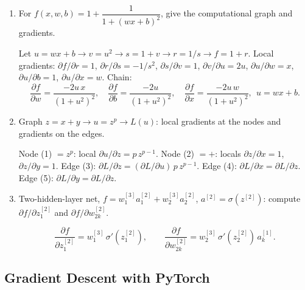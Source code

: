 \documentclass[10pt,a4paper]{article}
\newcommand{\q}[1]{\item #1}
\begin{document}
\begin{enumerate}[leftmargin=*,label=\textbf{Q\arabic*.}]

\q For $f(x,w,b)=1+\dfrac{1}{1+(wx+b)^2}$, give the computational graph and gradients.
\begin{answerbox}
Let $u=wx+b \to v=u^2 \to s=1+v \to r=1/s \to f=1+r$. Local gradients: $\partial f/\partial r=1$, $\partial r/\partial s=-1/s^2$, $\partial s/\partial v=1$, $\partial v/\partial u=2u$, $\partial u/\partial w=x$, $\partial u/\partial b=1$, $\partial u/\partial x=w$. Chain:
\[ \frac{\partial f}{\partial w} = \frac{-2u\,x}{(1+u^2)^2},\quad
   \frac{\partial f}{\partial b} = \frac{-2u}{(1+u^2)^2},\quad
   \frac{\partial f}{\partial x} = \frac{-2u\,w}{(1+u^2)^2},\ \ u=wx+b. \]
\end{answerbox}

\q Graph $z=x+y \to u=z^p \to L(u)$: local gradients at the nodes and gradients on the edges.
\begin{answerbox}
Node (1) $=z^p$: local $\partial u/\partial z = p\,z^{p-1}$. Node (2) $=+$: locals $\partial z/\partial x=1$, $\partial z/\partial y=1$.
Edge (3): $\partial L/\partial z = (\partial L/\partial u)\,p\,z^{p-1}$. Edge (4): $\partial L/\partial x = \partial L/\partial z$. Edge (5): $\partial L/\partial y = \partial L/\partial z$.
\end{answerbox}

\q Two-hidden-layer net, $f=w^{[3]}_1 a^{[2]}_1 + w^{[3]}_2 a^{[2]}_2$, $a^{[2]}=\sigma(z^{[2]})$: compute $\partial f/\partial z^{[2]}_1$ and $\partial f/\partial w^{[2]}_{2k}$.
\begin{answerbox}
\[ \frac{\partial f}{\partial z^{[2]}_1} = w^{[3]}_1\,\sigma'(z^{[2]}_1), \qquad
   \frac{\partial f}{\partial w^{[2]}_{2k}} = w^{[3]}_2\,\sigma'(z^{[2]}_2)\,a^{[1]}_k. \]
\end{answerbox}

\end{enumerate}

\subsection{Gradient Descent with PyTorch}
\end{document}
